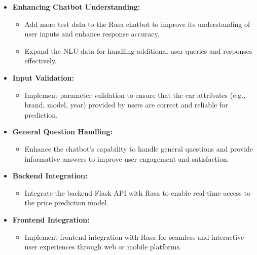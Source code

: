 \documentclass[a4paper,12pt]{article}
\begin{document}
\begin{itemize}
    \item \textbf{Enhancing Chatbot Understanding:}
    \begin{itemize}
        \item Add more test data to the Rasa chatbot to improve its understanding of user inputs and enhance response accuracy.
        \item Expand the NLU data for handling additional user queries and responses effectively.
    \end{itemize}
    
    \item \textbf{Input Validation:}
    \begin{itemize}
        \item Implement parameter validation to ensure that the car attributes (e.g., brand, model, year) provided by users are correct and reliable for prediction.
    \end{itemize}

    \item \textbf{General Question Handling:}
    \begin{itemize}
        \item Enhance the chatbot's capability to handle general questions and provide informative answers to improve user engagement and satisfaction.
    \end{itemize}

    \item \textbf{Backend Integration:}
    \begin{itemize}
        \item Integrate the backend Flask API with Rasa to enable real-time access to the price prediction model.
    \end{itemize}

    \item \textbf{Frontend Integration:}
    \begin{itemize}
        \item Implement frontend integration with Rasa for seamless and interactive user experiences through web or mobile platforms.
    \end{itemize}
\end{itemize}
\end{document}
